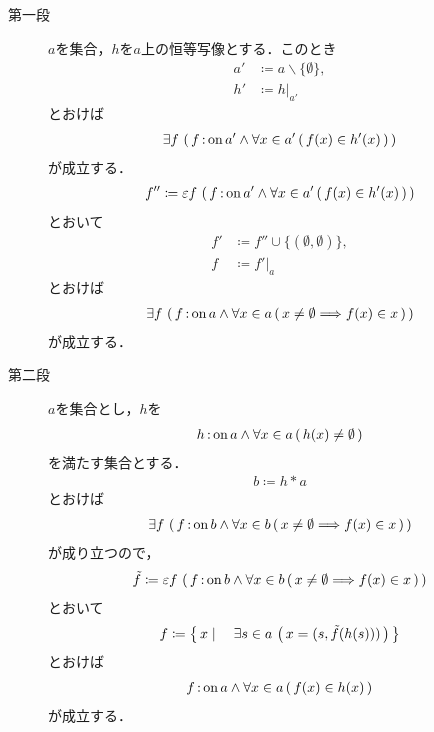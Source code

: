 	\begin{prf}\mbox{}
		\begin{description}
			\item[第一段] $a$を集合，$h$を$a$上の恒等写像とする．このとき
				\begin{align}
					a' &\coloneqq a \backslash \{\emptyset\}, \\
					h' &\coloneqq h|_{a'}
				\end{align}
				とおけば
				\begin{align}
					\exists f\, \left(\, f \operatorname*{:on} a' \wedge \forall x \in a'\, (\, f(x) \in h'(x)\, )\, \right)
				\end{align}
				が成立する．
				\begin{align}
					f'' \coloneqq \varepsilon f\, \left(\, f \operatorname*{:on} a' \wedge \forall x \in a'\, (\, f(x) \in h'(x)\, )\, \right)
				\end{align}
				とおいて
				\begin{align}
					f' &\coloneqq f'' \cup \{(\emptyset,\emptyset)\}, \\
					f &\coloneqq f'|_a
				\end{align}
				とおけば
				\begin{align}
					\exists f\, \left(\, f \operatorname*{:on} a \wedge \forall x \in a\, (\, x \neq \emptyset \Longrightarrow f(x) \in x\, )\, \right)
				\end{align}
				が成立する．
			
			\item[第二段] $a$を集合とし，$h$を
				\begin{align}
					h \operatorname*{:on} a \wedge \forall x \in a\, (\, h(x) \neq \emptyset\, )
				\end{align}
				を満たす集合とする．
				\begin{align}
					b \coloneqq h \ast a
				\end{align}
				とおけば
				\begin{align}
					\exists f\, \left(\, f \operatorname*{:on} b \wedge \forall x \in b\, (\, x \neq \emptyset \Longrightarrow f(x) \in x\, )\, \right)
				\end{align}
				が成り立つので，
				\begin{align}
					\tilde{f} \coloneqq \varepsilon f\, \left(\, f \operatorname*{:on} b \wedge \forall x \in b\, (\, x \neq \emptyset \Longrightarrow f(x) \in x\, )\, \right)
				\end{align}
				とおいて
				\begin{align}
					f \coloneqq \left\{\, x \mid \quad \exists s \in a\, \left(\, x=(s,\tilde{f}(h(s)))\, \right)\, \right\}
				\end{align}
				とおけば
				\begin{align}
					f \operatorname*{:on} a \wedge \forall x \in a\, (\, f(x) \in h(x)\, )
				\end{align}
				が成立する．
		\end{description}
	\end{prf}
	
